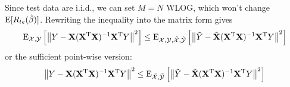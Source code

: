 \begin{sol}
Since test data are i.i.d., we can set $M=N$ WLOG, which won't change $\operatorname{E}[R_{te}(\hat{\beta})]$. Rewriting the inequality into the matrix form gives
\[
\operatorname{E}_{\mathcal{X},\mathcal{Y}}\left[\left\|Y-\mathbf{X}(\mathbf{X}^\mathrm{T}\mathbf{X})^{-1}\mathbf{X}^\mathrm{T}Y\right\|^2\right] \le \operatorname{E}_{\mathcal{X},\mathcal{Y},\tilde{\mathcal{X}},\tilde{\mathcal{Y}}}\left[\left\|\tilde{Y}-\tilde{\mathbf{X}}(\mathbf{X}^\mathrm{T}\mathbf{X})^{-1}\mathbf{X}^\mathrm{T}Y\right\|^2\right]
\]
or the sufficient point-wise version:
\[
\left\|Y-\mathbf{X}(\mathbf{X}^\mathrm{T}\mathbf{X})^{-1}\mathbf{X}^\mathrm{T}Y\right\|^2 \le \operatorname{E}_{\tilde{\mathcal{X}},\tilde{\mathcal{Y}}}\left[\left\|\tilde{Y}-\tilde{\mathbf{X}}(\mathbf{X}^\mathrm{T}\mathbf{X})^{-1}\mathbf{X}^\mathrm{T}Y\right\|^2\right]
\]
\end{sol}
